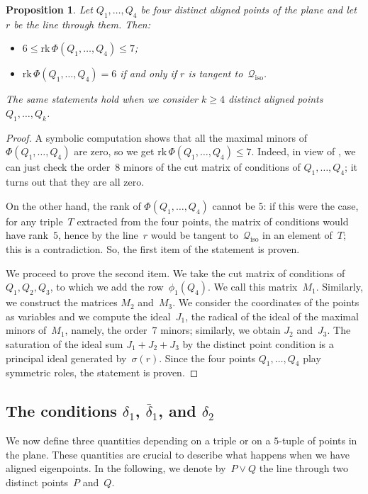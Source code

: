 \documentclass[a4paper, 11pt, reqno]{amsart}
\theoremstyle{plain}
\newtheorem{prop}[lemma]{Proposition}
\theoremstyle{definition}
\newcommand{\rk}{\ensuremath{\mathrm{rk}}}
\newcommand{\iso}{\mathcal{Q}_{\mathrm{iso}}}
\begin{document}
\begin{prop}
\label{proposition:four_aligned}
Let $Q_1, \dotsc, Q_4$ be four distinct aligned points of the plane and
let $r$ be the line through them. Then:
%
\begin{itemize}
  \item $6 \leq \rk \,\Phi(Q_1, \dotsc, Q_4) \leq 7$;
  \item $\rk \,\Phi(Q_1, \dotsc, Q_4) = 6$ if and only if $r$ is tangent to~$\iso$.
\end{itemize}
%
The same statements hold when we consider $k \geq 4$ distinct aligned points $Q_1, \dotsc, Q_k$.
\end{prop}
\begin{proof}
A symbolic computation shows that all the maximal minors of~$\Phi(Q_1, \dotsc, Q_4)$ are zero, so we get 
$\rk \, \Phi(Q_1, \dotsc, Q_4) \leq 7$.
Indeed, in view of , we can just check the order~$8$ minors of the cut matrix of conditions of $Q_1, \dotsc, Q_4$;
it turns out that they are all zero.

On the other hand, the rank of $\Phi(Q_1, \dotsc, Q_4)$ cannot be $5$:
if this were the case, for any triple~$T$ extracted from the four points, the matrix of conditions would have rank~$5$, hence by  the line~$r$ would be tangent to~$\iso$ in an element of~$T$; this is a contradiction.
So, the first item of the statement is proven.

We proceed to prove the second item.
We take the cut matrix of conditions of~$Q_1, Q_2, Q_3$, to which we add the row~$\phi_1(Q_4)$.
We call this matrix~$M_1$.
Similarly, we construct the matrices $M_2$ and~$M_3$.
We consider the coordinates of the points as variables and we compute the ideal~$J_1$,
the radical of the ideal of the maximal minors of~$M_1$, namely, the order~$7$ minors;
similarly, we obtain $J_2$ and~$J_3$.
The saturation of the ideal sum $J_1 + J_2 + J_3$ by the distinct point condition is a principal ideal generated by~$\sigma(r)$.
Since the four points $Q_1, \dotsc, Q_4$ play symmetric roles, the statement is proven.
\end{proof}

\subsection{The conditions \texorpdfstring{$\delta_1$}{delta1}, \texorpdfstring{$\bar{\delta}_1$}{deltabar1}, and \texorpdfstring{$\delta_2$}{delta2}}

We now define three quantities depending on a triple or on a $5$-tuple of points in the plane.
These quantities are crucial to describe what happens when we have aligned eigenpoints.
In the following, we denote by~$P \vee Q$ the line through two distinct points~$P$ and~$Q$.
\end{document}
